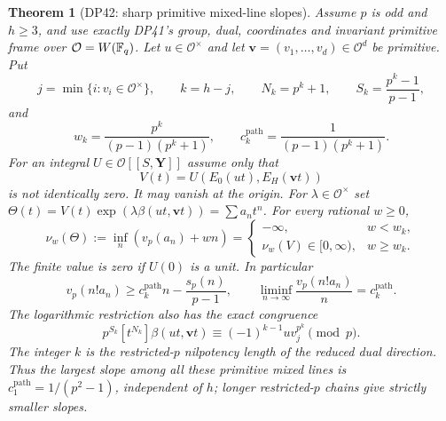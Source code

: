 \documentclass[11pt,a4paper]{article}
\newtheorem{theorem}{Theorem}[section]
\theoremstyle{definition}\newtheorem{remark}[theorem]{Remark}
\newcommand{\vp}{v_p}\newcommand{\dR}{\mathrm{dR}}\newcommand{\crys}{\mathrm{crys}}
\begin{document}
\begin{theorem}[DP42: sharp primitive mixed-line slopes]\label{DP42}
Assume $p$ is odd and $h\ge3$, and use exactly DP41's group, dual, coordinates and invariant primitive frame over $\mathcal O=W(\mathbb F_q)$. Let $u\in\mathcal O^\times$ and let $\mathbf v=(v_1,\ldots,v_d)\in\mathcal O^d$ be primitive. Put
\[
 j=\min\{i:v_i\in\mathcal O^\times\},\qquad k=h-j,\qquad
 N_k=p^k+1,\qquad S_k=\frac{p^k-1}{p-1},
\]
and
\[
 w_k=\frac{p^k}{(p-1)(p^k+1)},\qquad
 c_k^{\mathrm{path}}=\frac1{(p-1)(p^k+1)}.
\]
For an integral $U\in\mathcal O[[S,\mathbf Y]]$ assume only that
\[
 V(t)=U(E_0(ut),E_H(\mathbf vt))
\]
is not identically zero. It may vanish at the origin. For $\lambda\in\mathcal O^\times$ set
$\Theta(t)=V(t)\exp(\lambda\beta(ut,\mathbf vt))=\sum a_nt^n$.
For every rational $w\ge0$,
\[
 \nu_w(\Theta):=\inf_n(\vp(a_n)+wn)=
 \begin{cases}
 -\infty,&w<w_k,\\
 \nu_w(V)\in[0,\infty),&w\ge w_k.
 \end{cases}
\]
The finite value is zero if $U(0)$ is a unit. In particular
\begin{equation}\label{eq:pathsharp}
 \vp(n!a_n)\ge c_k^{\mathrm{path}}n-\frac{s_p(n)}{p-1},
 \qquad
 \liminf_{n\to\infty}\frac{\vp(n!a_n)}n=c_k^{\mathrm{path}}.
\end{equation}
The logarithmic restriction also has the exact congruence
\begin{equation}\label{eq:pathcoefficient}
 p^{S_k}[t^{N_k}]\beta(ut,\mathbf vt)
       \equiv(-1)^{k-1}u v_j^{p^k}\pmod p.
\end{equation}
The integer $k$ is the restricted-$p$ nilpotency length of the reduced dual direction. Thus the largest slope among all these primitive mixed lines is
$c_1^{\mathrm{path}}=1/(p^2-1)$, independent of $h$; longer restricted-$p$ chains give strictly smaller slopes.
\end{theorem}
\end{document}

